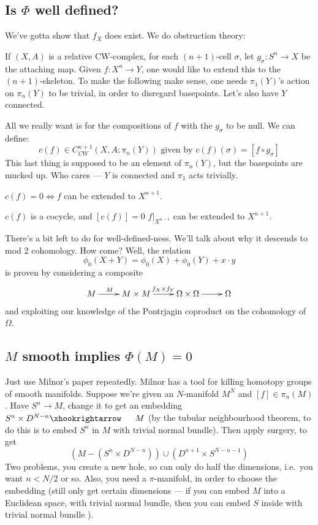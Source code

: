 \documentclass[11pt]{article}
\begin{document}
\begin{JandrKervaire}
\subsection*{Is $\Phi$ well defined?}
We've gotta show that $f_X$ does exist. We do obstruction theory:

If $(X,A)$ is a relative CW-complex, for each $(n+1)$-cell $\sigma$, let $g_\sigma:S^n\to X$ be the attaching map. Given $f:X^n\to Y$, one would like to extend this to the $(n+1)$-skeleton. To make the following make sense, one needs $\pi_1(Y)$'s action on $\pi_n(Y)$ to be trivial, in order to disregard basepoints. Let's also have $Y$ connected.

All we really want is for the compositions of $f$ with the $g_\sigma$ to be null. We can define:
\[c(f)\in C^{n+1}_{CW}(X,A;\pi_n(Y))\text{\ given by }c(f)(\sigma)=[f\circ g_\sigma]\]
This last thing is supposed to be an element of $\pi_n(Y)$, but the basepoints are mucked up. Who cares --- $Y$ is connected and $\pi_1$ acts trivially.
\begin{thm*}
\begin{itemise}
\item $c(f)=0\iff f$ can be extended to $X^{n+1}$.
\item $c(f)$ is a cocycle, and $[c(f)]=0$ \Iff $f|_{X^{n-1}}$ can be extended to $X^{n+1}$.
\end{itemise}
\end{thm*}
\noindent There's a bit left to do for well-defined-ness. We'll talk about why it descends to mod 2 cohomology. How come? Well, the relation
\[\phi_0(X+Y)=\phi_0(X)+\phi_0(Y)+x\cdot y\]
is proven by considering a composite
\[\xymatrix{
M\ar[r]^{M\quad}&M\times M\ar[r]^{\ f_X\times f_Y}&\Omega\times\Omega\ar[r]&\Omega
}\]
and exploiting our knowledge of the Pontrjagin coproduct on the cohomology of $\Omega$.
\subsection*{$M$ smooth implies $\Phi(M)=0$}
Just use Milnor's paper repeatedly. Milnor has a tool for killing homotopy groups of smooth manifolds. Suppose we're given an $N$-manifold $M^N$ and $[f]\in\pi_n(M)$. Have $S^n\to M$, change it to get an embedding $S^n\times D^{N-n}\cofibration M$ (by the tubular neighbourhood theorem, to do this is to embed $S^n$ in $M$ with trivial normal bundle). Then apply surgery, to get
\[(M-(S^n\times D^{N-n}))\cup (D^{n+1}\times S^{N-n-1})\]
Two problems, you create a new hole, so can only do half the dimensions, i.e.\ you want $n<N/2$ or so. Also, you need a $\pi$-manifold, in order to choose the embedding (still only get certain dimensions --- if you can embed $M$ into a Euclidean space, with trivial normal bundle, then you can embed $S$ inside with trivial normal bundle ).


\end{JandrKervaire}
\end{document}
